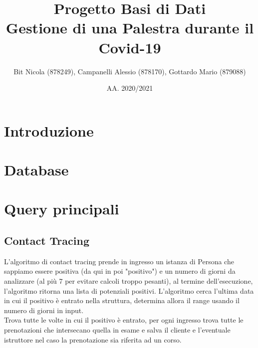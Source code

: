 \documentclass[a4paper,11pt,titlepage]{article}
\title{Progetto Basi di Dati\\Gestione di una Palestra durante il Covid-19}
\author{Bit Nicola (878249), Campanelli Alessio (878170), Gottardo Mario (879088)}
\date{AA. 2020/2021}
\begin{document}
\maketitle
\tableofcontents
\pagebreak
\section{Introduzione}

\section{Database}

\section{Query principali}

\subsection{Contact Tracing}
L'algoritmo di contact tracing prende in ingresso un istanza di Persona che sappiamo essere positiva (da qui in poi "positivo") e un numero di giorni da analizzare (al più 7 per evitare calcoli troppo pesanti), al termine dell'esecuzione, l'algoritmo ritorna una lista di potenziali positivi. L'algoritmo cerca l'ultima data in cui il positivo è entrato nella struttura, determina allora il range usando il numero di giorni in input.\\
Trova tutte le volte in cui il positivo è entrato, per ogni ingresso trova tutte le prenotazioni che intersecano quella in esame e salva il cliente e l'eventuale istruttore nel caso la prenotazione sia riferita ad un corso.
\end{document}
